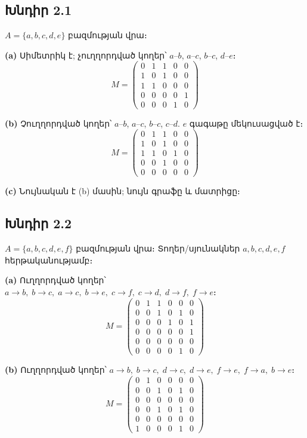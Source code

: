 \subsection*{Խնդիր 2.1}

$A=\{a,b,c,d,e\}$ բազմության վրա։

\textbf{(a)} Սիմետրիկ է; չուղղորդված կողեր՝ $a$--$b$, $a$--$c$, $b$--$c$, $d$--$e$։
\[
  M = \begin{pmatrix}
  0&1&1&0&0\\1&0&1&0&0\\1&1&0&0&0\\0&0&0&0&1\\0&0&0&1&0
  \end{pmatrix}
\]

\textbf{(b)} Չուղղորդված կողեր՝ $a$--$b$, $a$--$c$, $b$--$c$, $c$--$d$. $e$ գագաթը մեկուսացված է։
\[
  M = \begin{pmatrix}
  0&1&1&0&0\\1&0&1&0&0\\1&1&0&1&0\\0&0&1&0&0\\0&0&0&0&0
  \end{pmatrix}
\]

\textbf{(c)} Նույնական է (b) մասին; նույն գրաֆը և մատրիցը։


\subsection*{Խնդիր 2.2}

$A=\{a,b,c,d,e,f\}$ բազմության վրա։ Տողեր/սյունակներ $a,b,c,d,e,f$ հերթականությամբ։

\textbf{(a)} Ուղղորդված կողեր՝ $a\!\to\!b,\; b\!\to\!c,\; a\!\to\!c,\; b\!\to\!e,\; c\!\to\!f,\; c\!\to\!d,\; d\!\to\!f,\; f\!\to\!e$։
\[
  M = \begin{pmatrix}
  0&1&1&0&0&0\\0&0&1&0&1&0\\0&0&0&1&0&1\\0&0&0&0&0&1\\0&0&0&0&0&0\\0&0&0&0&1&0
  \end{pmatrix}
\]

\textbf{(b)} Ուղղորդված կողեր՝ $a\!\to\!b,\; b\!\to\!c,\; d\!\to\!c,\; d\!\to\!e,\; f\!\to\!e,\; f\!\to\!a,\; b\!\to\!e$։
\[
  M = \begin{pmatrix}
  0&1&0&0&0&0\\0&0&1&0&1&0\\0&0&0&0&0&0\\0&0&1&0&1&0\\0&0&0&0&0&0\\1&0&0&0&1&0
  \end{pmatrix}
\]


